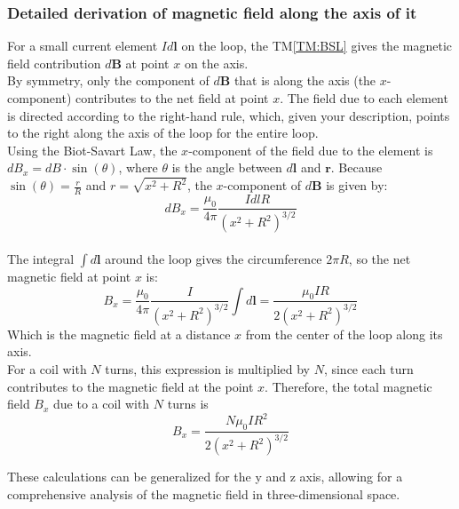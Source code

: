 \documentclass[12pt]{article}
\newcommand{\tref}[1]{TM\ref{#1}}
\begin{document}
\subsubsection*{Detailed derivation of magnetic field along the axis of it }
{For a small current element \(Id\mathbf{l}\) on the loop, the \tref{TM:BSL} gives the magnetic field contribution \(d\mathbf{B}\) at point \(x\) on the axis.\\

By symmetry, only the component of \(d\mathbf{B}\) that is along the axis (the \(x\)-component) contributes to the net field at point \(x\). The field due to each element is directed according to the right-hand rule, which, given your description, points to the right along the axis of the loop for the entire loop.\\


Using the Biot-Savart Law, the \(x\)-component of the field due to the element is \(dB_x = dB \cdot \sin(\theta)\), where \(\theta\) is the angle between \(d\mathbf{l}\) and \(\mathbf{r}\). Because \(\sin(\theta) = \frac{r}{R}\) and \(r = \sqrt{x^2 + R^2}\), the \(x\)-component of \(d\mathbf{B}\) is given by:
\[
dB_x = \frac{\mu_0}{4\pi} \frac{IdlR}{(x^2 + R^2)^{3/2}}
\]
\\
The integral \(\int d\mathbf{l}\) around the loop gives the circumference \(2\pi R\), so the net magnetic field at point \(x\) is:
\[
B_x = \frac{\mu_0}{4\pi} \frac{I}{(x^2 + R^2)^{3/2}} \int d\mathbf{l} = \frac{\mu_0 IR}{2(x^2 + R^2)^{3/2}}
\]Which is the magnetic field at a distance \(x\) from the center of the loop along its axis. \\


For a coil with \( N \) turns, this expression is multiplied by \( N \), since each turn contributes to the magnetic field at the point \( x \). Therefore, the total magnetic field \( B_x \) due to a coil with \( N \) turns is
\[
B_x = \frac{N \mu_0 I R^2}{2(x^2 + R^2)^{3/2}}
\]

These calculations can be generalized for the y and z axis, allowing for a comprehensive analysis of the magnetic field in three-dimensional space.
}
\end{document}
